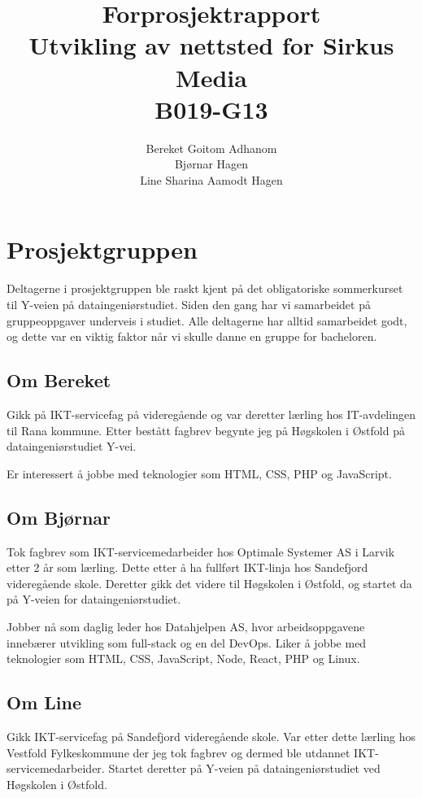 \documentclass[11pt,a4paper]{report}
\begin{document}
\title{
\LARGE
Forprosjektrapport \\
\vspace{2cm}
Utvikling av nettsted for Sirkus Media \\
\vspace{2cm}
\Huge
B019-G13
}
\author{
\LARGE 
Bereket Goitom Adhanom \\
\LARGE 
Bjørnar Hagen \\
\LARGE 
Line Sharina Aamodt Hagen
}
\maketitle

\section*{Prosjektgruppen}

Deltagerne i prosjektgruppen ble raskt kjent på det obligatoriske sommerkurset til Y-veien på dataingeniørstudiet. Siden den gang har vi samarbeidet på gruppeoppgaver underveis i studiet. Alle deltagerne har alltid samarbeidet godt, og dette var en viktig faktor når vi skulle danne en gruppe for bacheloren. 

\subsection*{Om Bereket}
Gikk på IKT-servicefag på  videregående og var deretter lærling hos IT-avdelingen til Rana kommune. Etter bestått fagbrev begynte jeg på Høgskolen i Østfold på dataingeniørstudiet Y-vei.

Er interessert å jobbe med teknologier som HTML, CSS, PHP og JavaScript.

\subsection*{Om Bjørnar}
Tok fagbrev som IKT-servicemedarbeider hos Optimale Systemer AS i Larvik etter 2 år som lærling. Dette etter å ha fullført IKT-linja hos Sandefjord videregående skole. Deretter gikk det videre til Høgskolen i Østfold, og startet da på Y-veien for dataingeniørstudiet.

Jobber nå som daglig leder hos Datahjelpen AS, hvor arbeidsoppgavene innebærer utvikling som full-stack og en del DevOps. Liker å jobbe med teknologier som HTML, CSS, JavaScript, Node, React, PHP og Linux.

\subsection*{Om Line}
Gikk IKT-servicefag på Sandefjord videregående skole. Var etter dette lærling hos Vestfold Fylkeskommune der jeg tok fagbrev og dermed ble utdannet IKT-servicemedarbeider. Startet deretter på Y-veien på dataingeniørstudiet ved Høgskolen i Østfold. 
\end{document}
